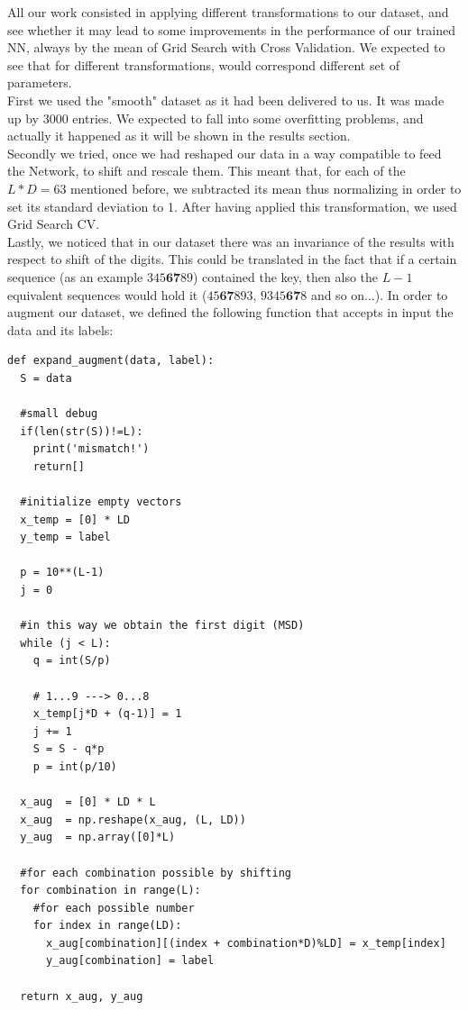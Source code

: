 \documentclass[prl,twocolumn]{revtex4-1}
\begin{document}
All our work consisted in applying different transformations to our dataset, and see whether it may lead to some improvements in the performance of our trained NN, always by the mean of Grid Search with Cross Validation. We expected to see that for different transformations, would correspond different set of parameters.\\
First we used the "smooth" dataset as it had been delivered to us. It was made up by 3000 entries. We expected to fall into some overfitting problems, and actually it happened as it will be shown in the results section.\\
Secondly we tried, once we had reshaped our data in a way compatible to feed the Network, to shift and rescale them. This meant that, for each of the $L*D = 63$ mentioned before, we subtracted its mean thus normalizing in order to set its standard deviation to 1. After having applied this transformation, we used Grid Search CV.\\
Lastly, we noticed that in our dataset there was an invariance of the results with respect to shift of the digits. This could be translated in the fact that if a certain sequence (as an example $345\textbf{67}89$) contained the key, then also the $L-1$ equivalent sequences would hold it ($45\textbf{67}893$, $9345\textbf{67}8$ and so on...). In order to augment our dataset, we defined the following function that accepts in input the data and its labels:

\begin{verbatim}
def expand_augment(data, label):
  S = data

  #small debug 
  if(len(str(S))!=L):
    print('mismatch!')
    return[]
    
  #initialize empty vectors
  x_temp = [0] * LD
  y_temp = label

  p = 10**(L-1)
  j = 0

  #in this way we obtain the first digit (MSD)
  while (j < L):
    q = int(S/p)

    # 1...9 ---> 0...8
    x_temp[j*D + (q-1)] = 1
    j += 1
    S = S - q*p
    p = int(p/10)

  x_aug  = [0] * LD * L
  x_aug  = np.reshape(x_aug, (L, LD))
  y_aug  = np.array([0]*L)

  #for each combination possible by shifting
  for combination in range(L):
    #for each possible number 
    for index in range(LD):
      x_aug[combination][(index + combination*D)%LD] = x_temp[index]
      y_aug[combination] = label 

  return x_aug, y_aug

\end{verbatim}
\end{document}
